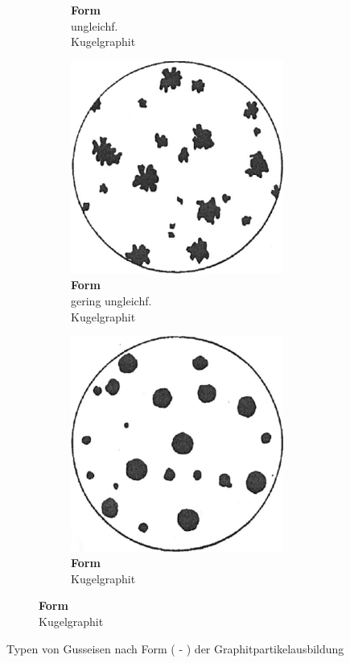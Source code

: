 \documentclass[
fontsize=10pt, 
listof = totoc,
parskip = half	
]{report}
\newcommand{\uproman}[1]{\uppercase\expandafter{\romannumeral#1}}
\begin{document}
\begin{figure}[h]
\begin{subfigure}{1.0\linewidth}
\begin{subfigure}[t]{0.33\textwidth}
			\caption*{\textbf{Form \uproman{4}}\\ungleichf. \\ Kugelgraphit}
		\end{subfigure}
		\begin{subfigure}[t]{0.33\textwidth}
			\centering
			\includegraphics[scale=0.25]{pics/graphit_form5}
			\caption*{\textbf{Form \uproman{5}}\\gering ungleichf.\\Kugelgraphit }
		\end{subfigure}
		\begin{subfigure}[t]{0.33\textwidth}
			\centering
			\includegraphics[scale=0.25]{pics/graphit_form6}
			\caption*{\textbf{Form \uproman{6}}\\Kugelgraphit}
		\end{subfigure}
	\end{subfigure}
	\caption{Typen von Gusseisen nach Form (\uproman{1} - \uproman{6}) der Graphitpartikelausbildung \cite[S.7]{ISO945}}
	\label{fig:GraphitTypes}
\end{figure}
\end{document}
